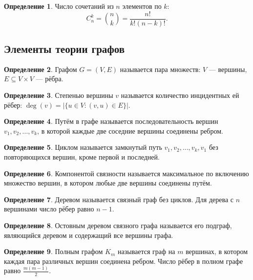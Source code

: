 \documentclass[a4paper]{article}
\theoremstyle{definition}
\newtheorem{definition}{Определение}[subsection]
\begin{document}
\begin{definition}
Число сочетаний из $n$ элементов по $k$:
\begin{equation}
    C_n^k = \binom{n}{k} = \frac{n!}{k!(n - k)!}. \tag{31}
\end{equation}
\end{definition}

\subsection{Элементы теории графов}

\begin{definition}
Графом $G = (V, E)$ называется пара множеств: $V$ — вершины, $E \subseteq V \times V$ — рёбра.
\end{definition}

\begin{definition}
Степенью вершины $v$ называется количество инцидентных ей рёбер: $\deg(v) = |\{u \in V : (v, u) \in E\}|$.
\end{definition}

\begin{definition}
Путём в графе называется последовательность вершин $v_1, v_2, \dots, v_k$, в которой каждые две соседние вершины соединены ребром.
\end{definition}

\begin{definition}
Циклом называется замкнутый путь $v_1, v_2, \dots, v_k, v_1$ без повторяющихся вершин, кроме первой и последней.
\end{definition}

\begin{definition}
Компонентой связности называется максимальное по включению множество вершин, в котором любые две вершины соединены путём.
\end{definition}

\begin{definition}
Деревом называется связный граф без циклов. Для дерева с $n$ вершинами число рёбер равно $n - 1$.
\end{definition}

\begin{definition}
Остовным деревом связного графа называется его подграф, являющийся деревом и содержащий все вершины графа.
\end{definition}

\begin{definition}
Полным графом $K_m$ называется граф на $m$ вершинах, в котором каждая пара различных вершин соединена ребром. Число рёбер в полном графе равно $\frac{m(m - 1)}{2}$.
\end{definition}
\end{document}

